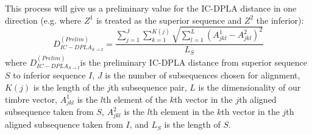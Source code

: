\documentclass[12pt]{report} 	%
\numberwithin{figure}{chapter}
\numberwithin{table}{chapter}
\numberwithin{equation}{chapter}
\begin{document}
\begin{flushleft}
This process will give us a preliminary value for the IC-DPLA distance in one direction (e.g. where $Z^1$ is treated as the superior sequence and $Z^2$ the inferior):
\begin{equation}
D_{IC-DPLA_{S \to I}}^{(Prelim)} = \frac{\sum_{j=1}^J \sum_{k=1}^{K(j)} \sqrt{ \sum_{l=1}^L (A_{jkl}^1 - A_{jkl}^2)^2}}{L_S}
\end{equation}
where $D_{IC-DPLA_{S \to I}}^{(Prelim)} $is the preliminary IC-DPLA distance from superior sequence $S$ to inferior sequence $I$, $J$ is the number of subsequences chosen for alignment, $K(j)$ is the length of the $j$th subsequence pair, $L$ is the dimensionality of our timbre vector, $A_{jkl}^1$ is the $l$th element of the $k$th vector in the $j$th aligned subsequence taken from $S$, $A_{jkl}^2$ is the $l$th element in the $k$th vector in the $j$th aligned subsequence taken from $I$, and $L_S$ is the length of $S$.


\end{flushleft}
\end{document}
